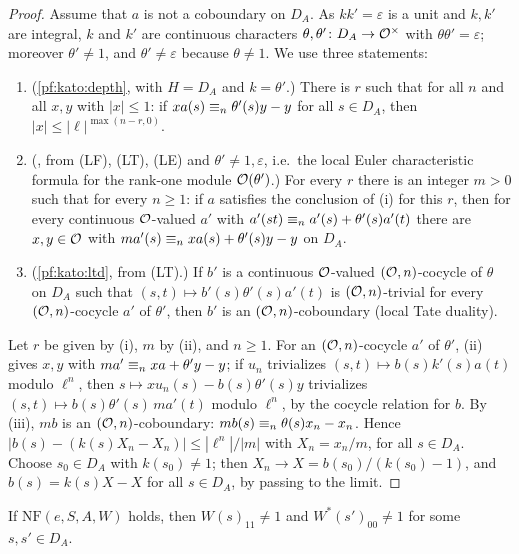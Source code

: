 \begin{proof}
Assume that $a$ is not a coboundary on $D_A$. As $kk'=\varepsilon$ is a unit and $k,k'$ are integral, $k$ and $k'$ are continuous characters
$\theta,\theta'\colon D_A\to\mathcal{O}^\times$ with $\theta\theta'=\varepsilon$; moreover $\theta'\ne1$, and $\theta'\ne\varepsilon$ because $\theta\ne1$. We use three
statements:
\begin{enumerate}[label=(\roman*)]
\item (\cref{pf:kato:depth}, with $H=D_A$ and $k=\theta'$.) There is $r$ such that for all $n$ and all $x,y$ with $|x|\le1$:
  if $xa(s)\equiv_{n}\theta'(s)y-y$ for all $s\in D_A$, then $|x|\le|\ell|^{\max(n-r,0)}$.
\item (, from (LF), (LT), (LE) and $\theta'\ne1,\varepsilon$,
  i.e.\ the local Euler characteristic formula for the rank-one module $\mathcal{O}(\theta')$.) For every $r$ there is an integer $m>0$ such that
  for every $n\ge1$: if $a$ satisfies the conclusion of (i) for this $r$, then for every continuous $\mathcal{O}$-valued $a'$ with
  $a'(st)\equiv_{n}a'(s)+\theta'(s)a'(t)$ there are $x,y\in\mathcal{O}$ with $ma'(s)\equiv_{n}xa(s)+\theta'(s)y-y$ on $D_A$.
\item (\cref{pf:kato:ltd}, from (LT).) If $b'$ is a continuous
  $\mathcal{O}$-valued $(\mathcal{O},n)$-cocycle of $\theta$ on $D_A$ such that $(s,t)\mapsto b'(s)\theta'(s)a'(t)$ is $(\mathcal{O},n)$-trivial for every
  $(\mathcal{O},n)$-cocycle $a'$ of $\theta'$, then $b'$ is an $(\mathcal{O},n)$-coboundary (local Tate duality).
\end{enumerate}
Let $r$ be given by (i), $m$ by (ii), and $n\ge1$. For an $(\mathcal{O},n)$-cocycle $a'$ of $\theta'$, (ii) gives $x,y$ with
$ma'\equiv_{n}xa+\theta'y-y$; if $u_n$ trivializes $(s,t)\mapsto b(s)k'(s)a(t)$ modulo $\ell^n$, then
$s\mapsto xu_n(s)-b(s)\theta'(s)y$ trivializes $(s,t)\mapsto b(s)\theta'(s)\,ma'(t)$ modulo $\ell^n$, by the cocycle relation for $b$.
By (iii), $mb$ is an $(\mathcal{O},n)$-coboundary: $mb(s)\equiv_{n}\theta(s)x_n-x_n$. Hence $|b(s)-(k(s)X_n-X_n)|\le|\ell^n|/|m|$ with
$X_n=x_n/m$, for all $s\in D_A$. Choose $s_0\in D_A$ with $k(s_0)\ne1$; then $X_n\to X=b(s_0)/(k(s_0)-1)$, and $b(s)=k(s)X-X$ for all
$s\in D_A$, by passing to the limit.
\end{proof}

\begin{lemma}\label{pf:kato:nontriv}
If $\mathrm{NF}(e,S,A,W)$ holds, then $W(s)_{11}\ne1$ and $W^*(s')_{00}\ne1$ for some $s,s'\in D_A$.
\end{lemma}

